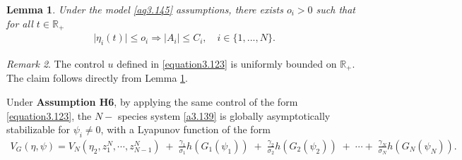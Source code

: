 \documentclass[10pt, a4paper]{amsart}
\newcounter{assu}
\theoremstyle{plain}
\newtheorem{lemma}{Lemma}[section]
\theoremstyle{definition}
\theoremstyle{remark}
\newtheorem{remark}[lemma]{Remark}
\numberwithin{equation}{section}
\begin{document}
\begin{lemma}\label{lem3.19}
Under the model \eqref{aq3.145} assumptions, there exists $o_i>0$ such that for all $t\in \mathbb{R}_+$ 
\begin{align}
\vert\eta_i(t)\vert\leq o_i\Longrightarrow\vert A_i\vert\leq C_i,\quad i\in\lbrace 1,...,N\rbrace.
\end{align}
\end{lemma}
\begin{remark}
The control $u$ defined in \eqref{equation3.123} is uniformly bounded on $\mathbb{R}_+$. The claim follows directly from Lemma \ref{lem3.19}.
\end{remark}
Under {\bf Assumption H6}, by applying the same control of the form \eqref{equation3.123}, the $N-$ species system \eqref{a3.139} is globally asymptotically stabilizable for $\psi_i \neq 0$, with a Lyapunov function of the form 
\begin{align}\label{a3.160}
V_G(\eta,\psi)
= V_{{N}}(\eta_2,z^N_1,\cdots,z^N_{N-1})\;+\;\frac{\gamma_1}{\sigma_1}h(G_1(\psi_1))\;+\;\frac{\gamma_2}{\sigma_2}h(G_2(\psi_2))\;+\;\cdots+\;\frac{\gamma_{N}}{\sigma_{N}}h(G_{N}(\psi_{N})).
\end{align}
\end{document}
